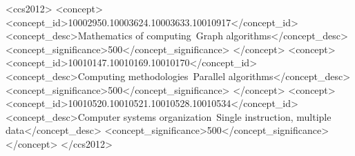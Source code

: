 \documentclass[sigconf, anonymous, review,table]{acmart}
\begin{document}
  
\begin{CCSXML}
<ccs2012>
 <concept>
   <concept_id>10002950.10003624.10003633.10010917</concept_id>
   <concept_desc>Mathematics of computing~Graph algorithms</concept_desc>
   <concept_significance>500</concept_significance>
 </concept>
 <concept>
   <concept_id>10010147.10010169.10010170</concept_id>
   <concept_desc>Computing methodologies~Parallel algorithms</concept_desc>
   <concept_significance>500</concept_significance>
 </concept>
 <concept>
   <concept_id>10010520.10010521.10010528.10010534</concept_id>
   <concept_desc>Computer systems organization~Single instruction, multiple data</concept_desc>
   <concept_significance>500</concept_significance>
 </concept>
</ccs2012>
\end{CCSXML}



\maketitle











\end{document}

